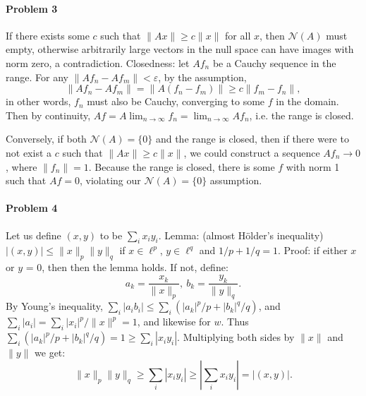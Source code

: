 \documentclass[12pt]{article}
\newcommand{\N}{\mathcal{N}}
\begin{document}
\paragraph{Problem 3}

If there exists some $c$ such that $\|Ax\|\geq c\|x\|$ for all $x$, then $\N(A)$
must empty, otherwise arbitrarily large vectors in the null space can have images
with norm zero, a contradiction. Closedness: let $Af_n$ be a Cauchy sequence in
the range. For any $\|Af_n-Af_m\| < \varepsilon$, by the assumption,
\begin{displaymath}
  \|Af_n-Af_m\| = \|A(f_n-f_m)\| \geq c\|f_m-f_n\|,
\end{displaymath}
in other words, $f_n$ must also be Cauchy, converging to some $f$ in the domain.
Then by continuity, $Af = A\lim_{n\to\infty}f_n = \lim_{n\to\infty}Af_n$, i.e. the
range is closed.

Conversely, if both $\N(A) = \{0\}$ and the range is closed, then if there were
to not exist a $c$ such that $\|Ax\|\geq c\|x\|$, we could construct a
sequence $Af_n\to 0$, where $\|f_n\| = 1$. Because the range is closed, there is
some $f$ with norm 1 such that $Af = 0$, violating our $\N(A) = \{0\}$
assumption.

\paragraph{Problem 4}
Let us define $(x,y)$ to be $\sum_ix_iy_i$.
Lemma: (almost H\"older's inequality) $|(x,y)| \leq \|x\|_p \|y\|_q$ if $x\in
\ell^p$, $y\in\ell^q$ and $1/p + 1/q = 1$. Proof: if either $x$ or $y$ = 0,
then then the lemma holds. If not, define:
\begin{displaymath}
  a_k = \frac{x_k}{\|x\|_p},\ b_k = \frac{y_k}{\|y\|_q}.
\end{displaymath}
By Young's inequality, $\sum_i|a_ib_i| \leq \sum_i(|a_k|^p/p + |b_k|^q/q)$, and
$\sum_i|a_i| = \sum_i |x_i|^p/\|x\|^p = 1$, and likewise for $w$. Thus $\sum_i
(|a_k|^p/p + |b_k|^q/q) = 1 \geq \sum_i|x_iy_i|$. Multiplying both sides by
$\|x\|$ and $\|y\|$ we get:
\begin{displaymath}
  \|x\|_p\|y\|_q \geq \sum_i|x_iy_i| \geq |\sum_ix_iy_i| = |(x,y)|.
\end{displaymath}
\end{document}
